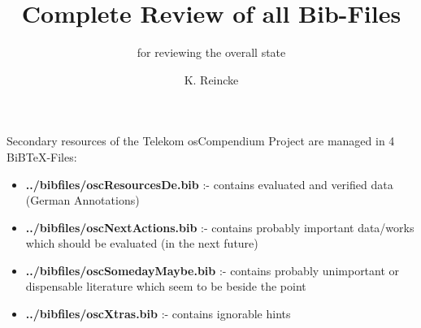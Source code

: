 \documentclass[DIV=calc,BCOR=5mm,11pt,headings=small,oneside,abstract=true,toc=bib]{scrartcl}
\begin{document}
\nocite{*}

\titlehead{Deutsche Konfiguration}
\subject{BiBTeX-Files}
\title{Complete Review of all Bib-Files}
\subtitle{for reviewing the overall state}
\author{K. Reincke}
\maketitle

Secondary resources of the Telekom osCompendium Project are managed in 4
BiBTeX-Files:

\begin{itemize}
  \item {\bfseries ../bibfiles/oscResourcesDe.bib} :- contains evaluated and
  verified data (German Annotations)
  \item {\bfseries ../bibfiles/oscNextActions.bib} :- contains
  probably important data/works which should be evaluated (in the next future)
  \item {\bfseries ../bibfiles/oscSomedayMaybe.bib} :-
  contains probably unimportant or dispensable literature which seem to be beside the point
  \item {\bfseries ../bibfiles/oscXtras.bib} :- contains ignorable hints
\end{itemize}

\small


\end{document}
